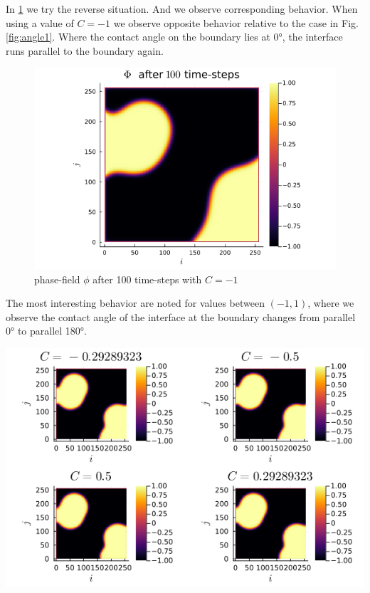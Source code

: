 \documentclass{mimosis}
\begin{document}
In \ref{fig:angle-1} we try the reverse situation. And we observe corresponding behavior. When using a value of \(C=-1\) we observe opposite behavior relative to the case in Fig. \ref{fig:angle1}. Where the contact angle on the boundary lies at 0°, the interface runs parallel to the boundary again.
\begin{figure}[htbp]
\centering
\includegraphics[width=.9\linewidth]{images/angle-.png}
\caption{\label{fig:angle-1}phase-field \(\phi\) after 100 time-steps with \(C=-1\)}
\end{figure}

The most interesting behavior are noted for values between \((-1,1)\), where we observe the contact angle of the interface at the boundary changes from parallel 0° to parallel 180°.
\begin{center}
\includegraphics[width=.9\linewidth]{images/angle-sqrt(2).png}
\label{fig:angle-multiple}
\end{center}
\end{document}
